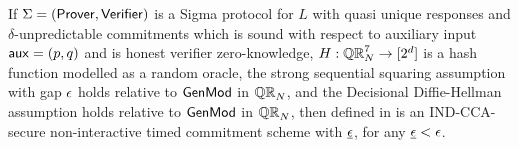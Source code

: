 %
%



\begin{theorem}
\label{thm:NITC-mul-ROM}
If $\Sigma = (\mathsf{Prover}, \mathsf{Verifier})$ is a Sigma protocol for $L$ with quasi unique responses and $\delta$-unpredictable commitments which is sound with respect to auxiliary input $\mathsf{aux}=(p,q)$ and is honest verifier zero-knowledge, $H: \mathbb{QR}_N^7 \rightarrow [2^d]$ is a hash function modelled as a random oracle,  the strong sequential squaring assumption with gap $\epsilon$ holds relative to $\mathsf{GenMod}$ in $\mathbb{QR}_N$, and the Decisional Diffie-Hellman assumption holds relative to $\mathsf{GenMod}$ in $\mathbb{QR}_N$, then \mathlist{(\pgen, \com, \cvrfy, \dvrfy, \fdecom)} defined in  is an IND-CCA-secure non-interactive timed commitment scheme with $\underline{\epsilon}$, for any $\underline{\epsilon} < \epsilon$. 
\end{theorem}

